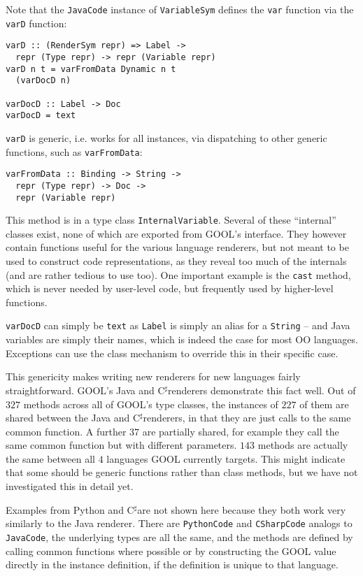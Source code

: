 \documentclass[sigplan,review,anonymous,prologue,dvipsnames]{acmart}
\newcommand{\Csharp}{C$^{\sharp}$}
\begin{document}
Note that the \verb|JavaCode| instance of \verb|VariableSym| defines the
\verb|var| function via the \verb|varD| function:
\begin{lstlisting}
varD :: (RenderSym repr) => Label ->
  repr (Type repr) -> repr (Variable repr)
varD n t = varFromData Dynamic n t
  (varDocD n)

varDocD :: Label -> Doc
varDocD = text
\end{lstlisting}
\verb|varD| is generic, i.e. works for all instances, via dispatching to other
generic functions, such as \verb|varFromData|:
\begin{lstlisting}
varFromData :: Binding -> String ->
  repr (Type repr) -> Doc ->
  repr (Variable repr)
\end{lstlisting}
This method is in a type class \verb|InternalVariable|. Several of these
``internal'' classes exist, none of which are exported from GOOL's interface.
They however contain functions useful for the various language renderers, but
not meant to be used to construct code representations, as they reveal too
much of the internals (and are rather tedious to use too).  One important
example is the \verb|cast| method, which is never needed by user-level code,
but frequently used by higher-level functions.

\verb|varDocD| can simply be \verb|text| as \verb|Label| is simply an
alias for a \verb|String| -- and Java variables are simply their names,
which is indeed the case for most OO languages.  Exceptions can use the
class mechanism to override this in their specific case.

This genericity
makes writing new renderers for new languages fairly straightforward.
GOOL's Java and \Csharp renderers demonstrate this fact well. Out of $327$
methods across all of GOOL's type classes, the instances of $227$ of them are
shared between the Java and \Csharp renderers, in that they are just calls to the
same common function. A further $37$ are partially shared, for example they call
the same common function but with different parameters. $143$ methods are
actually the same between all $4$ languages GOOL currently targets. This might
indicate that some should be generic functions rather than class methods,
but we have not investigated this in detail yet.

Examples from Python and \Csharp are not shown here because they both
work very similarly to the Java renderer. There are \verb|PythonCode| and
\verb|CSharpCode| analogs to \verb|JavaCode|, the underlying types are all the
same, and the methods are defined by calling common functions where possible
or by constructing the GOOL value directly in the instance definition, if the
definition is unique to that language.
\end{document}
